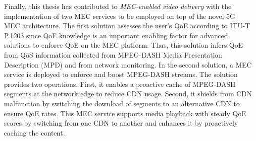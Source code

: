 \begin{abstracts}
Finally, this thesis has contributed to \textit{MEC-enabled video delivery} with the implementation of two MEC services to be employed on top of the novel 5G MEC architecture. The first solution assesses the user's QoE according to ITU-T P.1203 since QoE knowledge is an important enabling factor for advanced solutions to enforce QoE on the MEC platform. Thus, this solution infers QoE from QoS information collected from MPEG-DASH Media Presentation Description (MPD) and from network monitoring.
In the second solution, a MEC service is deployed to enforce and boost MPEG-DASH streams. The solution provides two operations. First, it enables a proactive cache of MPEG-DASH segments at the network edge to reduce CDN usage. Second, it shields from CDN malfunction by switching the download of segments to an alternative CDN to ensure QoE rates. This MEC service supports media playback with steady QoE scores by switching from one CDN to another and enhances it by proactively caching the content.


\end{abstracts}

%
%






